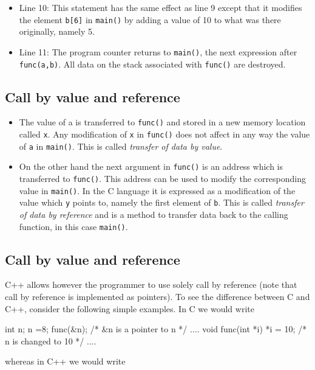 \documentclass[%
oneside,                 %
final,                   %
10pt]{article}
\begin{document}
{{{{{{{{{{{\begin{itemize}
  \item Line 10: This statement has the same effect as line 9 except that it modifies the element \Verb!b[6]! in \Verb!main()! by adding a value of 10 to what was there originally, namely 5.

  \item Line 11: The program counter returns to \Verb!main()!, the next expression after \Verb!func(a,b)!. All data on the stack associated with \Verb!func()! are destroyed.
\end{itemize}

\noindent
\subsection{Call by value and reference}

\begin{itemize}
  \item The value of a is transferred to \Verb!func()! and stored in a new memory location called \Verb!x!. Any modification of \Verb!x! in \Verb!func()! does not affect in any way the value of \Verb!a! in \Verb!main()!. This is called \emph{transfer of data by value}.

  \item On the other hand the next argument in \Verb!func()! is an address which is transferred to \Verb!func()!. This address can be used to modify the corresponding value in \Verb!main()!. In the C language it is expressed as a modification of the value which \Verb!y! points to, namely the first element of \Verb!b!. This is called \emph{transfer of data by reference} and is a method to transfer data back to the calling function, in this case \Verb!main()!.
\end{itemize}

\noindent
\subsection{Call by value and reference}

C++ allows however the programmer to use solely call by reference
(note that call by reference is implemented as pointers).
To see the difference between C and C++, consider the following simple
examples. In C we would write

\bcppcod
   int n; n =8;
   func(&n); /* &n is a pointer to n */
   ....
   void func(int *i)
   {
     *i = 10; /* n is changed to 10 */
     ....
   }
\ecppcod

whereas in C++ we would write

}}}}}}}}}}}
\end{document}

